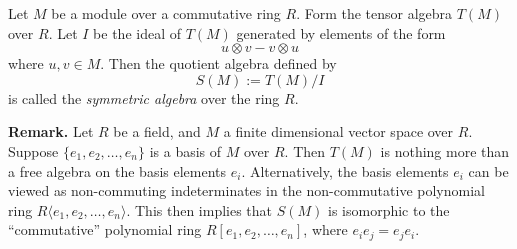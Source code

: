 \documentclass[12pt]{article}
\begin{document}
Let $M$ be a module over a commutative ring $R$.  Form the tensor algebra $T(M)$ over $R$.  Let $I$ be the ideal of $T(M)$ generated by elements of the form
$$u\otimes v-v\otimes u$$
where $u,v\in M$.
Then the quotient algebra defined by $$S(M):=T(M)/I$$
is called the \emph{symmetric algebra} over the ring $R$.

\textbf{Remark.}  Let $R$ be a field, and $M$ a finite dimensional vector space over $R$.  Suppose $\lbrace e_1,e_2,\ldots,e_n\rbrace$ is a basis of $M$ over $R$.  Then $T(M)$ is nothing more than a free algebra on the basis elements $e_i$.  Alternatively, the basis elements $e_i$ can be viewed as non-commuting indeterminates in the non-commutative polynomial ring $R\langle e_1,e_2,\ldots,e_n \rangle$.  This then implies that $S(M)$ is isomorphic to the ``commutative'' polynomial ring $R[e_1,e_2,\ldots,e_n]$, where $e_ie_j=e_je_i$.
\end{document}
